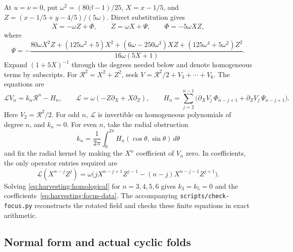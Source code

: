 At \(u=\nu=0\), put
\(\omega^2=(80\beta-1)/25\), \(X=x-1/5\), and
\(Z=(x-1/5+y-4/5)/(5\omega)\). Direct substitution gives
\begin{equation}\label{eq:harvesting:rotation}
 \dot X=-\omega Z+\Phi,\qquad
 \dot Z=\omega X+\Psi,\qquad \Phi=-5\omega XZ,
\end{equation}
where
\[
 \Psi=-\frac{
 80\omega X^2Z+(125\omega^2+5)X^2
 +(6\omega-250\omega^3)XZ
 +(125\omega^4+5\omega^2)Z^2}
 {16\omega(5X+1)}.
\]
Expand \((1+5X)^{-1}\) through the degrees needed below and denote
homogeneous terms by subscripts. For
\(\mathcal R^2=X^2+Z^2\), seek
\(V=\mathcal R^2/2+V_3+\cdots+V_6\). The equations are
\begin{equation}\label{eq:harvesting:homological}
 \mathcal L V_n=k_n\mathcal R^n-H_n,\qquad
 \mathcal L=\omega(-Z\partial_X+X\partial_Z),\qquad
 H_n=\sum_{j=2}^{n-1}
 \bigl(\partial_XV_j\,\Phi_{n-j+1}
       +\partial_ZV_j\,\Psi_{n-j+1}\bigr).
\end{equation}
Here \(V_2=\mathcal R^2/2\). For odd \(n\), \(\mathcal L\) is
invertible on homogeneous polynomials of degree \(n\), and
\(k_n=0\). For even \(n\), take the radial obstruction
\[
 k_n=\frac1{2\pi}\int_0^{2\pi}
 H_n(\cos\theta,\sin\theta)\,d\theta
\]
and fix the radial kernel by making the \(X^n\) coefficient of
\(V_n\) zero. In coefficients, the only operator entries required
are
\[
 \mathcal L(X^{n-j}Z^j)
 =\omega\bigl(jX^{n-j+1}Z^{j-1}
       -(n-j)X^{n-j-1}Z^{j+1}\bigr).
\]
Solving \eqref{eq:harvesting:homological} for $n=3,4,5,6$ gives
$k_3=k_5=0$ and the coefficients~\eqref{eq:harvesting:focus-data}.
The accompanying \texttt{scripts/check-focus.py} reconstructs the rotated
field and checks these finite equations in exact arithmetic.

\subsection{Normal form and actual cyclic folds}

